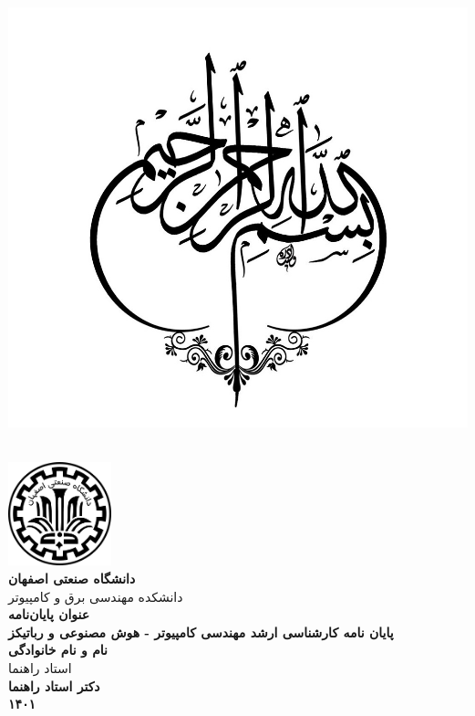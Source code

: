 
\thispagestyle{empty}
\
\pagebreak

\thispagestyle{empty}
\begin{center}
	~\vfill
	\includegraphics[scale=.4]{pictures/besm2.jpg}
	~\vfill
\end{center}
\pagebreak


\thispagestyle{empty}
\begin{center}
	\includegraphics[height=3cm]{pictures/iut_logo.png} \\
	\vspace{0.5cm}
	\large\textbf{دانشگاه صنعتی اصفهان} \\ دانشکده مهندسی برق و کامپیوتر \\
	\vspace{3.5cm}
	\LARGE\textbf{ عنوان پایان‌نامه} \\
	\vspace{3.5cm}
	\large\textbf{پایان نامه کارشناسی ارشد مهندسی کامپیوتر - هوش مصنوعی و رباتیکز} \\
	\vspace{1cm}
	\Large\textbf{نام و نام خانوادگی} \\
	\vspace{2.5cm}
	\large{استاد راهنما} \\
	\vspace{0.5cm}
	\Large\textbf{دکتر استاد راهنما} \\
	\vspace{3.5cm}
	\Large\textbf{۱۴۰۱} \\
\end{center}
\restoregeometry
\pagebreak



